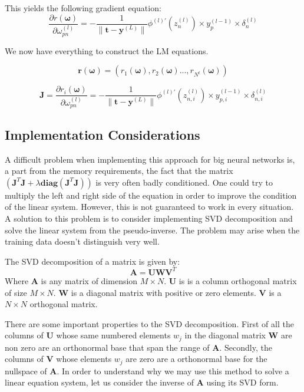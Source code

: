 \documentclass[a4paper,10pt]{article}
\theoremstyle{definition}
\begin{document}
This yields the following gradient equation:
\begin{equation}
	\frac{\partial r(\pmb{\omega})}{\partial \omega^{(l)}_{pn}} = - \frac{1}{\parallel \pmb{t} - \pmb{y}^{(L)}\parallel} \phi^{(l)'}(z^{(l)}_n) \times y^{(l-1)}_p \times \delta^{(l)}_n
\end{equation}

We now have everything to construct the LM equations.

\begin{equation}
	\pmb{r}(\pmb{\omega}) = (r_1(\pmb{\omega}), r_2(\pmb{\omega}) ..., r_{N^t}(\pmb{\omega}))
\end{equation}

\begin{equation}
	\pmb{J} = \frac{\partial r_i(\pmb{\omega})}{\partial \omega^{(l)}_{pn}} = - \frac{1}{\parallel \pmb{t} - \pmb{y}^{(L)}\parallel} \phi^{(l)'}(z^{(l)}_{n,i}) \times y^{(l-1)}_{p,i} \times \delta^{(l)}_{n,i}
\end{equation}

\subsection{Implementation Considerations}
A difficult problem when implementing this approach for big neural networks is, a part from the memory requirements, the fact that the matrix\\ $(\pmb{J}^T\pmb{J} + \lambda\pmb{diag}(\pmb{J}^T\pmb{J}))$ is very often badly conditioned. One could try to multiply the left and right side of the equation in order to improve the condition of the linear system. However, this is not guaranteed to work in every situation. A solution to this problem is to consider implementing SVD decomposition and solve the linear system from the pseudo-inverse. The problem may arise when the training data doesn't distinguish very well.

The SVD decomposition of a matrix is given by:
\begin{equation}
	\pmb{A} = \pmb{U}\pmb{W}\pmb{V}^T
\end{equation}
Where $\pmb{A}$ is any matrix of dimension $M\times N$. $\pmb{U}$ is is a column orthogonal matrix of size $M\times N$. $\pmb{W}$ is a diagonal matrix with positive or zero elements. $\pmb{V}$ is a $N\times N$ orthogonal matrix.

There are some important properties to the SVD decomposition. First of all the columns of $\pmb{U}$ whose same numbered elements $w_j$ in the diagonal matrix $\pmb{W}$ are non zero are an orthonormal base that span the range of $\pmb{A}$. Secondly, the columns of $\pmb{V}$ whose elements $w_j$ are zero are a orthonormal base for the nullspace of $\pmb{A}$. In order to understand why we may use this method to solve a linear equation system, let us consider the inverse of $\pmb{A}$ using its SVD form.
\end{document}
